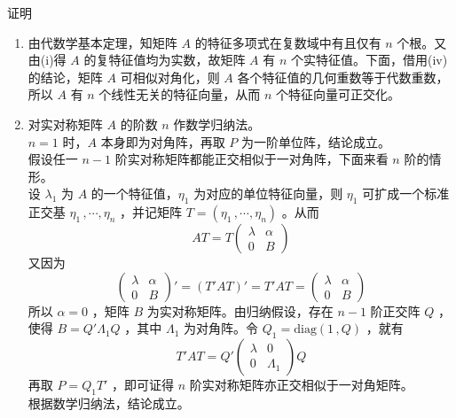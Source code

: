 \documentclass[12pt,hyperref,]{ctexart}
\begin{document}
证明

\songti

\begin{enumerate}
\def\labelenumi{(\roman{enumi})}
\setcounter{enumi}{2}
\item
  由代数学基本定理，知矩阵 \(A\) 的特征多项式在复数域中有且仅有 \(n\)
  个根。又由(i)得 \(A\) 的复特征值均为实数，故矩阵 \(A\) 有 \(n\)
  个实特征值。下面，借用(iv)的结论，矩阵 \(A\) 可相似对角化，则 \(A\)
  各个特征值的几何重数等于代数重数，所以 \(A\) 有 \(n\)
  个线性无关的特征向量，从而 \(n\) 个特征向量可正交化。
\item
  对实对称矩阵 \(A\) 的阶数 \(n\) 作数学归纳法。\\
  \(n=1\) 时，\(A\) 本身即为对角阵，再取 \(P\)
  为一阶单位阵，结论成立。\\
  假设任一 \(n-1\) 阶实对称矩阵都能正交相似于一对角阵，下面来看 \(n\)
  阶的情形。\\
  设 \(\lambda_1\) 为 \(A\) 的一个特征值，\(\eta_1\)
  为对应的单位特征向量，则 \(\eta_1\) 可扩成一个标准正交基
  \(\eta_1\, ,\cdots ,\eta_n\) ，并记矩阵
  \(T=(\eta_1\, ,\cdots ,\eta_n)\) 。从而 \begin{equation*}
  AT=T
  \begin{pmatrix}
  \lambda & \alpha \\
  0 & B
  \end{pmatrix}
  \end{equation*}又因为 \begin{equation*}
  \begin{pmatrix}
  \lambda & \alpha \\
  0 & B
  \end{pmatrix}'=(T'AT)'=T'AT=
  \begin{pmatrix}
  \lambda & \alpha \\
  0 & B
  \end{pmatrix}
  \end{equation*}所以 \(\alpha = 0\) ，矩阵 \(B\)
  为实对称矩阵。由归纳假设，存在 \(n-1\) 阶正交阵 \(Q\) ，使得
  \(B=Q'\Lambda_1 Q\) ，其中 \(\Lambda_1\) 为对角阵。令
  \(Q_1=\mathrm{diag}(1\, ,Q)\) ，就有 \begin{equation*}
  T'AT=Q'
  \begin{pmatrix}
  \lambda & 0 \\
  0 & \Lambda_1
  \end{pmatrix}Q
  \end{equation*}再取 \(P=Q_1T'\) ，即可证得 \(n\)
  阶实对称矩阵亦正交相似于一对角矩阵。\\
  根据数学归纳法，结论成立。

\end{enumerate}
\end{document}
